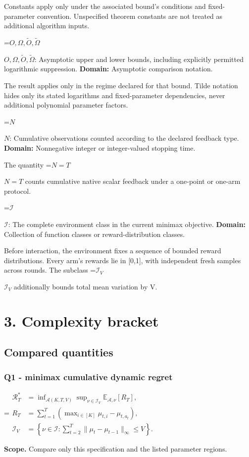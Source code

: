 \documentclass[10pt,a4paper]{article}
\newcommand{\AtlasMath}[1]{\par\begingroup\centering\setbox0=\hbox{$\displaystyle #1$}\ifdim\wd0>1.4\linewidth\typeout{ATLAS WIDE FORMULA: \the\wd0}\fi\ifdim\wd0>\linewidth\resizebox{\linewidth}{!}{\box0}\else\box0\fi\par\endgroup}
\newcommand{\AtlasInlineMath}[1]{\begingroup\setbox0=\hbox{$#1$}\ifdim\wd0>.4\linewidth\endgroup\AtlasMath{#1}\else\endgroup$#1$\fi}
\begin{document}
Constants apply only under the associated bound’s conditions and fixed-parameter convention. Unspecified theorem constants are not treated as additional algorithm inputs.

\AtlasInlineMath{O,\Omega,\widetilde O,\widetilde\Omega}: Asymptotic upper and lower bounds, including explicitly permitted logarithmic suppression. \textbf{Domain:} Asymptotic comparison notation.

The result applies only in the regime declared for that bound. Tilde notation hides only its stated logarithms and fixed-parameter dependencies, never additional polynomial parameter factors.

\AtlasInlineMath{N}: Cumulative observations counted according to the declared feedback type. \textbf{Domain:} Nonnegative integer or integer-valued stopping time.

The quantity \AtlasInlineMath{N=T} counts cumulative native scalar feedback under a one-point or one-arm protocol.

\AtlasInlineMath{\mathcal I}: The complete environment class in the current minimax objective. \textbf{Domain:} Collection of function classes or reward-distribution classes.

Before interaction, the environment fixes a sequence of bounded reward distributions. Every arm’s rewards lie in [0,1], with independent fresh samples across rounds. The subclass \AtlasInlineMath{\mathcal I_V} additionally bounds total mean variation by V.

\section{3. Complexity bracket}
\subsection{Compared quantities}
\subsubsection{Q1 - minimax cumulative dynamic regret}
\AtlasMath{\begin{aligned}\mathcal R_T^*&=\inf_{\mathcal A(K,T,V)}\sup_{\nu\in\mathcal I_V}\mathbb E_{\mathcal A,\nu}[R_T],\\ R_T&=\sum_{t=1}^T(\max_{i\in[K]}\mu_{t,i}-\mu_{t,a_t}),\\ \mathcal I_V&=\left\{\nu\in\mathcal I:\sum_{t=2}^T\|\mu_t-\mu_{t-1}\|_\infty\le V\right\}.\end{aligned}}
\textbf{Scope.} Compare only this specification and the listed parameter regions.
\end{document}
